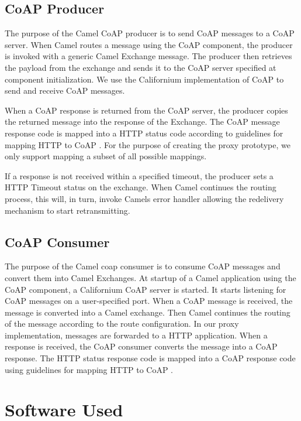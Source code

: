 \subsection{CoAP Producer}

The purpose of the Camel CoAP producer is to send CoAP messages to a CoAP
server. When Camel routes a message using the CoAP component, the producer is
invoked with a generic Camel Exchange message. The producer then retrieves the
payload from the exchange and sends it to the CoAP server specified at component
initialization. We use the Californium\cite{californium-homepage}
implementation of CoAP to send and receive CoAP messages.

When a CoAP response is returned from the CoAP server, the producer copies the
returned message into the response of the Exchange. The CoAP message response
code is mapped into a HTTP status code according to guidelines for mapping HTTP
to CoAP \cite{dijk}. For the purpose of creating the proxy prototype, we only
support mapping a subset of all possible mappings.

If a response is not received within a specified timeout, the producer sets a
HTTP Timeout status on the exchange. When Camel continues the routing process,
this will, in turn, invoke Camels error handler allowing the redelivery
mechanism to start retransmitting.


\subsection{CoAP Consumer}

The purpose of the Camel \gls{coap} consumer is to consume CoAP messages and
convert them into Camel Exchanges. At startup of a Camel application using the
CoAP component, a Californium CoAP server is started. It starts listening for
CoAP messages on a user-specified port. When a CoAP message is received, the
message is converted into a Camel exchange. Then Camel continues the routing of
the message according to the route configuration. In our proxy implementation,
messages are forwarded to a HTTP application. When a response is received, the
CoAP consumer converts the message into a CoAP response. The HTTP status
response code is mapped into a CoAP response code using guidelines for mapping
HTTP to CoAP \cite{dijk}.


\section{Software Used}

